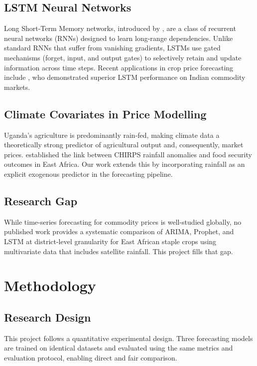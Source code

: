 \documentclass[12pt,a4paper]{article}
\begin{document}
\subsection{LSTM Neural Networks}
Long Short-Term Memory networks, introduced by \citet{hochreiter1997}, are a class of recurrent neural networks (RNNs) designed to learn long-range dependencies. Unlike standard RNNs that suffer from vanishing gradients, LSTMs use gated mechanisms (forget, input, and output gates) to selectively retain and update information across time steps. Recent applications in crop price forecasting include \citet{sabu2020}, who demonstrated superior LSTM performance on Indian commodity markets.

\subsection{Climate Covariates in Price Modelling}
Uganda's agriculture is predominantly rain-fed, making climate data a theoretically strong predictor of agricultural output and, consequently, market prices. \citet{brown2009} established the link between CHIRPS rainfall anomalies and food security outcomes in East Africa. Our work extends this by incorporating rainfall as an explicit exogenous predictor in the forecasting pipeline.

\subsection{Research Gap}
While time-series forecasting for commodity prices is well-studied globally, no published work provides a systematic comparison of ARIMA, Prophet, and LSTM at district-level granularity for East African staple crops using multivariate data that includes satellite rainfall. This project fills that gap.

\section{Methodology}

\subsection{Research Design}
This project follows a quantitative experimental design. Three forecasting models are trained on identical datasets and evaluated using the same metrics and evaluation protocol, enabling direct and fair comparison.
\end{document}
